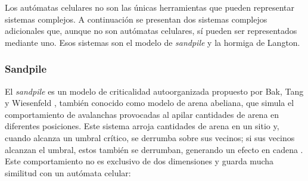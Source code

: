 Los autómatas celulares no son las únicas herramientas que pueden representar sistemas complejos. A continuación se presentan dos sistemas complejos adicionales que, aunque no son autómatas celulares, sí pueden ser representados mediante uno. Esos sistemas son el modelo de \textit{sandpile} y la hormiga de Langton.

\subsubsection{Sandpile}

El \textit{sandpile} es un modelo de criticalidad autoorganizada propuesto por Bak, Tang y Wiesenfeld \cite{bak1987}, también conocido como modelo de arena abeliana, que simula el comportamiento de avalanchas provocadas al apilar cantidades de arena en diferentes posiciones. Este sistema arroja cantidades de arena en un sitio y, cuando alcanza un umbral crítico, se derrumba sobre sus vecinos; si sus vecinos alcanzan el umbral, estos también se derrumban, generando un efecto en cadena \cite{dhar1999abelian, socsim_btw_2019}. Este comportamiento no es exclusivo de dos dimensiones y guarda mucha similitud con un autómata celular:

